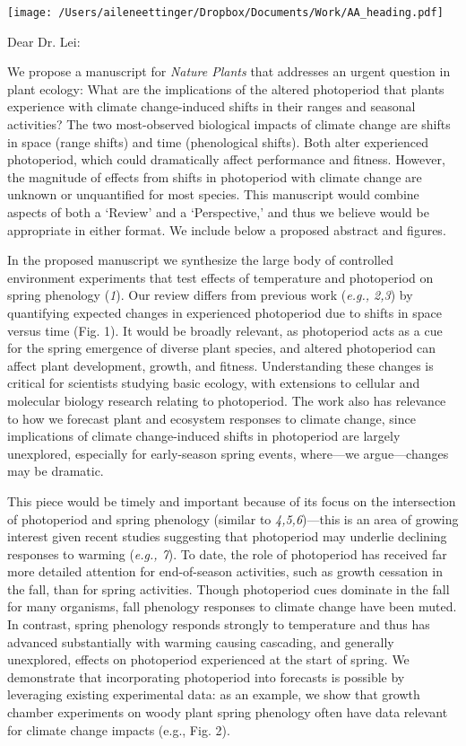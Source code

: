\documentclass[10.5pt,a4paper]{letter}
\begin{document}
\begin{letter}{}
\texttt{[image: /Users/aileneettinger/Dropbox/Documents/Work/AA\_heading.pdf]}

\opening{Dear Dr. Lei:}
\par We propose a manuscript for \emph{Nature Plants} that addresses an urgent question in plant ecology: What are the implications
of the altered photoperiod that plants experience with climate change-induced shifts in their ranges and seasonal
activities? The two most-observed biological impacts of climate change are shifts in space (range shifts) and time (phenological shifts). Both alter experienced photoperiod, which could dramatically affect performance and fitness. However, the magnitude of effects from shifts in photoperiod with climate change are unknown or unquantified for most species. This manuscript would combine aspects of both a `Review' and a `Perspective,' and thus we believe would be appropriate in either format. We include below a proposed abstract and figures.

\par In the proposed manuscript we synthesize the large body of controlled environment experiments that test effects of temperature and photoperiod on spring phenology (\emph{1}). Our review differs from previous work  (\emph{e.g., 2,3}) by quantifying expected changes in experienced photoperiod due to shifts in space versus time (Fig. 1). It would be broadly relevant, as photoperiod acts as a cue for the spring emergence of diverse plant species, and altered photoperiod can affect plant development, growth, and fitness. Understanding these changes is critical for scientists studying basic ecology, with extensions to cellular and molecular biology research relating to photoperiod. The work also has relevance to how we forecast plant and ecosystem responses to climate change, since implications of climate change-induced shifts in photoperiod are largely unexplored, especially for early-season spring events, where---we argue---changes may be dramatic.

\par This piece would be timely and important because of its focus on the intersection of photoperiod and spring phenology (similar to \emph{4,5,6})---this is an area of growing interest given recent studies suggesting that photoperiod may underlie declining responses to warming (\emph{e.g., 7}). To date, the role of photoperiod has received far more detailed attention for end-of-season activities, such as growth cessation in the fall, than for spring activities. Though photoperiod cues dominate in the fall for many organisms, fall phenology responses to climate change have been muted. In contrast, spring phenology responds strongly to temperature and thus has advanced substantially with warming causing cascading, and generally unexplored, effects on photoperiod experienced at the start of spring. We demonstrate that incorporating photoperiod into forecasts is possible by leveraging existing experimental data: as an example, we show that growth chamber experiments on woody plant spring phenology often have data relevant for climate change impacts (e.g., Fig. 2). 


\end{letter}
\end{document}
